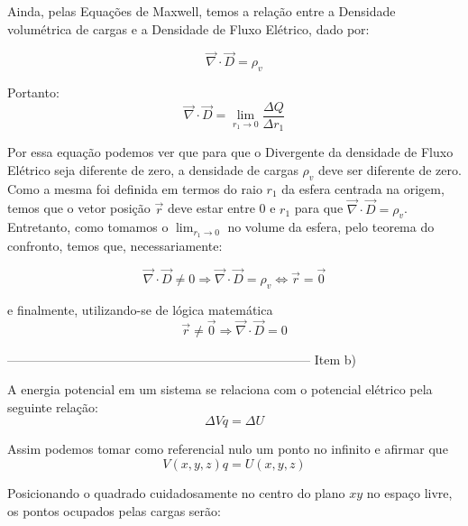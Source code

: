 \documentclass[journal,comsoc]{IEEEtran}
\begin{document}
 \par Ainda, pelas Equações de Maxwell, temos a relação entre a Densidade volumétrica de cargas e a Densidade de Fluxo Elétrico, dado por:
 
 \begin{equation}
 	\vec{\nabla}\cdot\vec{D} = \rho_{v}
 \end{equation}
 
 \par Portanto:
 \begin{equation}
 	\vec{\nabla}\cdot\vec{D} = \lim_{r_{1} \to 0} \frac{\Delta Q}{\Delta r_{1}}
 \end{equation}
 
\par Por essa equação podemos ver que para que o Divergente da densidade de Fluxo Elétrico seja diferente de zero, a densidade de cargas $\rho_{v}$ deve ser diferente de zero. Como a mesma foi definida em termos do raio $r_{1}$ da esfera centrada na origem, temos que o vetor posição $\vec{r}$ deve estar entre 0 e $r_{1}$ para que $\vec{\nabla}\cdot\vec{D} = \rho_{v}$. Entretanto, como tomamos o $\lim_{r_{1} \to 0}$ no volume da esfera, pelo teorema do confronto, temos que, necessariamente:
 
  \begin{equation}
 	\vec{\nabla}\cdot\vec{D} \ne 0
    \Rightarrow
    \vec{\nabla}\cdot\vec{D} = \rho_{v}
    \Leftrightarrow
    \vec{r} = \vec{0}
 \end{equation}
 \par e finalmente, utilizando-se de lógica matemática
  \begin{equation}
 	\vec{r} \ne \vec{0}
    \Rightarrow
    \vec{\nabla}\cdot\vec{D} = 0
 \end{equation}
 
------------------------------------------------------------------------
Item b)
\par A energia potencial em um sistema se relaciona com o potencial elétrico pela seguinte relação:
\begin{equation}
\Delta Vq = \Delta U
\end{equation}
\par Assim podemos tomar como referencial nulo um ponto no infinito e afirmar que
\begin{equation}
V(x,y,z)q = U(x,y,z)
\end{equation}

\par Posicionando o quadrado cuidadosamente no centro do plano $xy$ no espaço livre, os pontos ocupados pelas cargas serão:
\end{document}
